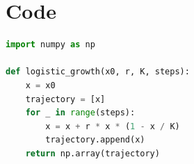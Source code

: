 \documentclass[12pt, letterpaper]{article}
\begin{document}
\appendix
\section{Code}
\begin{lstlisting}[language=Python, basicstyle=\small\ttfamily, breaklines=true]
import numpy as np

def logistic_growth(x0, r, K, steps):
    x = x0
    trajectory = [x]
    for _ in range(steps):
        x = x + r * x * (1 - x / K)
        trajectory.append(x)
    return np.array(trajectory)
\end{lstlisting}
% 
\end{document}
